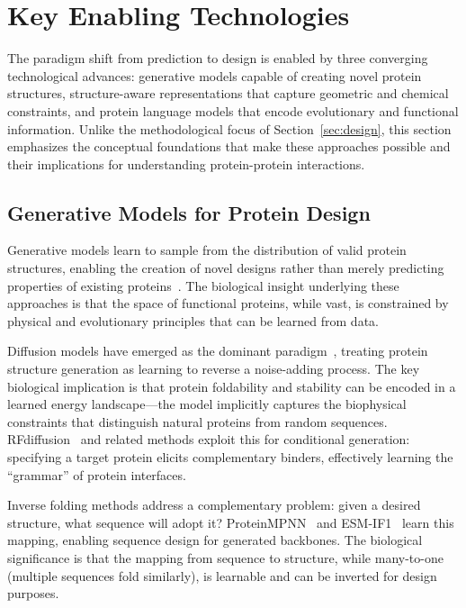 
\section{Key Enabling Technologies}
\label{sec:technologies}

The paradigm shift from prediction to design is enabled by three converging technological advances: generative models capable of creating novel protein structures, structure-aware representations that capture geometric and chemical constraints, and protein language models that encode evolutionary and functional information. Unlike the methodological focus of Section~\ref{sec:design}, this section emphasizes the conceptual foundations that make these approaches possible and their implications for understanding protein-protein interactions.

\subsection{Generative Models for Protein Design}
\label{subsec:generative}

Generative models learn to sample from the distribution of valid protein structures, enabling the creation of novel designs rather than merely predicting properties of existing proteins~\cite{watson2023rfdiffusion,ho2020denoising}. The biological insight underlying these approaches is that the space of functional proteins, while vast, is constrained by physical and evolutionary principles that can be learned from data.

Diffusion models have emerged as the dominant paradigm~\cite{ho2020denoising}, treating protein structure generation as learning to reverse a noise-adding process. The key biological implication is that protein foldability and stability can be encoded in a learned energy landscape---the model implicitly captures the biophysical constraints that distinguish natural proteins from random sequences. RFdiffusion~\cite{watson2023rfdiffusion} and related methods exploit this for conditional generation: specifying a target protein elicits complementary binders, effectively learning the ``grammar'' of protein interfaces.

Inverse folding methods address a complementary problem: given a desired structure, what sequence will adopt it? ProteinMPNN~\cite{dauparas2022proteinmpnn} and ESM-IF1~\cite{hsu2022esmif1} learn this mapping, enabling sequence design for generated backbones. The biological significance is that the mapping from sequence to structure, while many-to-one (multiple sequences fold similarly), is learnable and can be inverted for design purposes.

